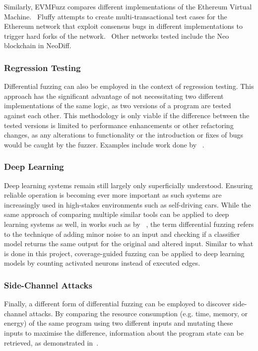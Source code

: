 \documentclass{article}
\let\savedCite=\cite
\renewcommand{\cite}{\unskip~\savedCite}
\begin{document}
\begin{multicols}{2}
    Similarly, EVMFuzz compares different implementations of the Ethereum Virtual Machine.\cite{EVMFuzz} Fluffy attempts to create multi-transactional test cases for the Ethereum network that exploit consensus bugs in different implementations to trigger hard forks of the network.\cite{Fluffy} Other networks tested include the Neo blockchain in NeoDiff.\cite{NeoDiff}

    \subsubsection{Regression Testing}

    Differential fuzzing can also be employed in the context of regression testing. This approach has the significant advantage of not necessitating two different implementations of the same logic, as two versions of a program are tested against each other. This methodology is only viable if the difference between the tested versions is limited to performance enhancements or other refactoring changes, as any alterations to functionality or the introduction or fixes of bugs would be caught by the fuzzer. Examples include work done by \citeauthor{HyDiff}\cite{HyDiff}.

    \subsubsection{Deep Learning}

    Deep learning systems remain still largely only superficially understood. Ensuring reliable operation is becoming ever more important as such systems are increasingly used in high-stakes environments such as self-driving cars. While the same approach of comparing multiple similar tools can be applied to deep learning systems as well, in works such as by \citeauthor{DLFuzz}\cite{DLFuzz}, the term differential fuzzing refers to the technique of adding minor noise to an input and checking if a classifier model returns the same output for the original and altered input. Similar to what is done in this project, coverage-guided fuzzing can be applied to deep learning models by counting activated neurons instead of executed edges.

    \subsubsection{Side-Channel Attacks}

    Finally, a different form of differential fuzzing can be employed to discover side-channel attacks. By comparing the resource consumption (e.g. time, memory, or energy) of the same program using two different inputs and mutating these inputs to maximise the difference, information about the program state can be retrieved, as demonstrated in\cite{DifFuzz}.


\end{multicols}
\end{document}
